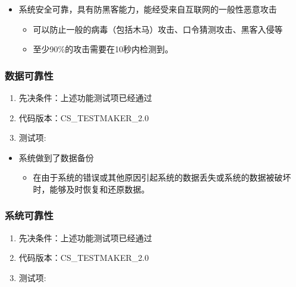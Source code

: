\documentclass[hyperref, a4paper]{ctexart}
\providecommand{\tightlist}{%
  \setlength{\itemsep}{0pt}\setlength{\parskip}{0pt}}
\begin{document}
\begin{itemize}
\tightlist
\item
  系统安全可靠，具有防黑客能力，能经受来自互联网的一般性恶意攻击

  \begin{itemize}
  \tightlist
  \item
    可以防止一般的病毒（包括木马）攻击、口令猜测攻击、黑客入侵等
  \item
    至少90\%的攻击需要在10秒内检测到。
  \end{itemize}
\end{itemize}

\hypertarget{ux6570ux636eux53efux9760ux6027}{%
\subsubsection{数据可靠性}\label{ux6570ux636eux53efux9760ux6027}}

\begin{enumerate}
\def\labelenumi{\arabic{enumi}.}
\tightlist
\item
  先决条件：上述功能测试项已经通过
\item
  代码版本：CS\_TESTMAKER\_2.0
\item
  测试项:
\end{enumerate}

\begin{itemize}
\tightlist
\item
  系统做到了数据备份

  \begin{itemize}
  \tightlist
  \item
    在由于系统的错误或其他原因引起系统的数据丢失或系统的数据被破坏时，能够及时恢复和还原数据。
  \end{itemize}
\end{itemize}

\hypertarget{ux7cfbux7edfux53efux9760ux6027}{%
\subsubsection{系统可靠性}\label{ux7cfbux7edfux53efux9760ux6027}}

\begin{enumerate}
\def\labelenumi{\arabic{enumi}.}
\tightlist
\item
  先决条件：上述功能测试项已经通过
\item
  代码版本：CS\_TESTMAKER\_2.0
\item
  测试项:
\end{enumerate}
\end{document}
